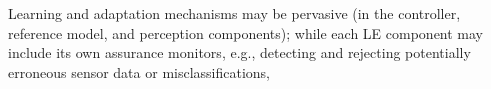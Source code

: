 Learning and adaptation mechanisms may be pervasive (in the controller, reference model, and perception components); 
%
while each LE component may include its own assurance monitors, e.g., detecting and rejecting potentially erroneous sensor data or misclassifications, 
